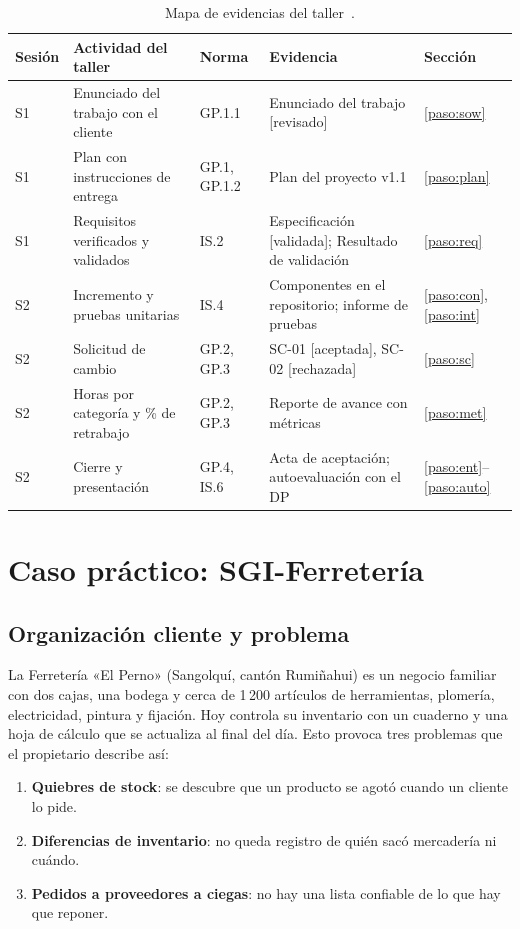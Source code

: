 \documentclass[11pt,a4paper]{article}
\begin{document}
\begin{table}[H]
\centering\small
\caption{Mapa de evidencias del taller~\cite{taller}.}
\label{tab:mapa-evidencias}
\begin{tabularx}{\linewidth}{@{}l P{4.3cm} l L l@{}}
\toprule
\textbf{Sesión} & \textbf{Actividad del taller} & \textbf{Norma} & \textbf{Evidencia} & \textbf{Sección} \\
\midrule
S1 & Enunciado del trabajo con el cliente & GP.1.1 & Enunciado del trabajo [revisado] & \ref{paso:sow} \\
S1 & Plan con instrucciones de entrega & GP.1, GP.1.2 & Plan del proyecto v1.1 & \ref{paso:plan} \\
S1 & Requisitos verificados y validados & IS.2 & Especificación [validada]; Resultado de validación & \ref{paso:req} \\
S2 & Incremento y pruebas unitarias & IS.4 & Componentes en el repositorio; informe de pruebas & \ref{paso:con}, \ref{paso:int} \\
S2 & Solicitud de cambio & GP.2, GP.3 & SC-01 [aceptada], SC-02 [rechazada] & \ref{paso:sc} \\
S2 & Horas por categoría y \% de retrabajo & GP.2, GP.3 & Reporte de avance con métricas & \ref{paso:met} \\
S2 & Cierre y presentación & GP.4, IS.6 & Acta de aceptación; autoevaluación con el DP & \ref{paso:ent}--\ref{paso:auto} \\
\bottomrule
\end{tabularx}
\end{table}

\section{Caso práctico: SGI-Ferretería}\label{sec:caso}

\subsection{Organización cliente y problema}
La Ferretería «El Perno» (Sangolquí, cantón Rumiñahui) es un negocio familiar con dos cajas, una bodega y cerca de 1\,200 artículos de herramientas, plomería, electricidad, pintura y fijación. Hoy controla su inventario con un cuaderno y una hoja de cálculo que se actualiza al final del día. Esto provoca tres problemas que el propietario describe así:
\begin{enumerate}
  \item \textbf{Quiebres de stock}: se descubre que un producto se agotó cuando un cliente lo pide.
  \item \textbf{Diferencias de inventario}: no queda registro de quién sacó mercadería ni cuándo.
  \item \textbf{Pedidos a proveedores a ciegas}: no hay una lista confiable de lo que hay que reponer.
\end{enumerate}
\end{document}
